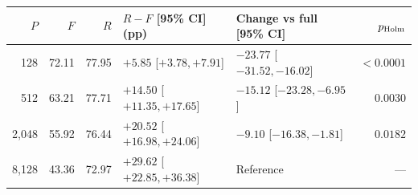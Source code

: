 \begin{tabular}{@{}rrrllr@{}}
\toprule
$P$ & $F$ & $R$ & $R-F$ [95\% CI] (pp) & Change vs full [95\% CI] & $p_{\rm Holm}$ \\
\midrule
128 & 72.11 & 77.95 & $+5.85$ [$ +3.78, +7.91 $] & $-23.77$ [$ -31.52, -16.02 $] & $<0.0001$ \\
512 & 63.21 & 77.71 & $+14.50$ [$ +11.35, +17.65 $] & $-15.12$ [$ -23.28, -6.95 $] & $0.0030$ \\
2,048 & 55.92 & 76.44 & $+20.52$ [$ +16.98, +24.06 $] & $-9.10$ [$ -16.38, -1.81 $] & $0.0182$ \\
8,128 & 43.36 & 72.97 & $+29.62$ [$ +22.85, +36.38 $] & Reference & --- \\
\bottomrule
\end{tabular}
